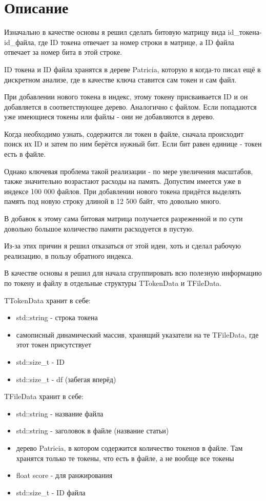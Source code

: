 \section{Описание}

Изначально в качестве основы я решил сделать битовую матрицу вида id\_токена-id\_файла, где ID токена отвечает за номер строки в матрице, а ID файла отвечает за номер бита в этой строке.

ID токена и ID файла хранятся в дереве Patricia, которую я когда-то писал ещё в дискретном анализе, где в качестве ключа ставится сам токен и сам файл.

При добавлении нового токена в индекс, этому токену присваивается ID и он добавляется в соответствующее дерево. Аналогично с файлом. Если попадаются уже имеющиеся токены или файлы - они не добавляются в дерево.

Когда необходимо узнать, содержится ли токен в файле, сначала происходит поиск их ID и затем по ним берётся нужный бит. Если бит равен единице - токен есть в файле.

Однако ключевая проблема такой реализации - по мере увеличения масштабов, также значительно возрастают расходы на память. Допустим имеется уже в индексе 100 000 файлов. При добавлении нового токена придётся выделять память под новую строку длиной в 12 500 байт, что довольно много.

В добавок к этому сама битовая матрица получается разреженной и по сути довольно большое количество памяти расходуется в пустую.

Из-за этих причин я решил отказаться от этой идеи, хоть и сделал рабочую реализацию, в пользу обратного индекса.

В качестве основы я решил для начала сгруппировать всю полезную информацию по токену и файлу в отдельные структуры TTokenData и TFileData. 

TTokenData хранит в себе:
\begin{itemize}
    \item std::string - строка токена
    \item самописный динамический массив, хранящий указатели на те TFileData, где этот токен присутствует
    \item std::size\_t - ID
    \item std::size\_t - df (забегая вперёд)
\end{itemize}

TFileData хранит в себе:
\begin{itemize}
    \item std::string - название файла
    \item std::string - заголовок в файле (название статьи)
    \item дерево Patricia, в котором содержится количество токенов в файле. Там хранятся только те токены, что есть в файле, а не вообще все токены
    \item float score - для ранжирования
    \item std::size\_t - ID файла
\end{itemize}

